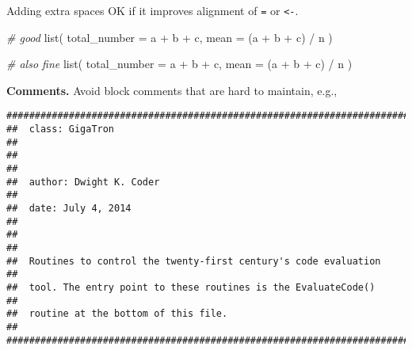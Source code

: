 \documentclass[
]{book}
\newenvironment{Shaded}{\begin{snugshade}}{\end{snugshade}}
\newcommand{\AttributeTok}[1]{\textcolor[rgb]{0.77,0.63,0.00}{#1}}
\newcommand{\CommentTok}[1]{\textcolor[rgb]{0.56,0.35,0.01}{\textit{#1}}}
\newcommand{\DecValTok}[1]{\textcolor[rgb]{0.00,0.00,0.81}{#1}}
\newcommand{\FunctionTok}[1]{\textcolor[rgb]{0.00,0.00,0.00}{#1}}
\newcommand{\NormalTok}[1]{#1}
\newcommand{\OtherTok}[1]{\textcolor[rgb]{0.56,0.35,0.01}{#1}}
\newcommand{\SpecialCharTok}[1]{\textcolor[rgb]{0.00,0.00,0.00}{#1}}
\begin{document}
\begin{Shaded}
\end{Shaded}

Adding extra spaces OK if it improves alignment of \texttt{=} or \texttt{\textless{}-}.

\begin{Shaded}
\begin{Highlighting}[]
\CommentTok{\# good}
\FunctionTok{list}\NormalTok{(}
    \AttributeTok{total\_number =}\NormalTok{ a }\SpecialCharTok{+}\NormalTok{ b }\SpecialCharTok{+}\NormalTok{ c,}
    \AttributeTok{mean         =}\NormalTok{ (a }\SpecialCharTok{+}\NormalTok{ b }\SpecialCharTok{+}\NormalTok{ c) }\SpecialCharTok{/}\NormalTok{ n}
\NormalTok{)}

\CommentTok{\# also fine}
\FunctionTok{list}\NormalTok{(}
    \AttributeTok{total\_number =}\NormalTok{ a }\SpecialCharTok{+}\NormalTok{ b }\SpecialCharTok{+}\NormalTok{ c,}
    \AttributeTok{mean =}\NormalTok{ (a }\SpecialCharTok{+}\NormalTok{ b }\SpecialCharTok{+}\NormalTok{ c) }\SpecialCharTok{/}\NormalTok{ n}
\NormalTok{)}
\end{Highlighting}
\end{Shaded}

\textbf{Comments.} Avoid block comments that are hard to maintain, e.g.,

\begin{verbatim}
####################################################################### 
##  class: GigaTron                                                  ## 
##                                                                   ## 
##  author: Dwight K. Coder                                          ## 
##  date: July 4, 2014                                               ## 
##                                                                   ## 
##  Routines to control the twenty-first century's code evaluation   ## 
##  tool. The entry point to these routines is the EvaluateCode()    ## 
##  routine at the bottom of this file.                              ## 
####################################################################### 
\end{verbatim}
\end{document}
